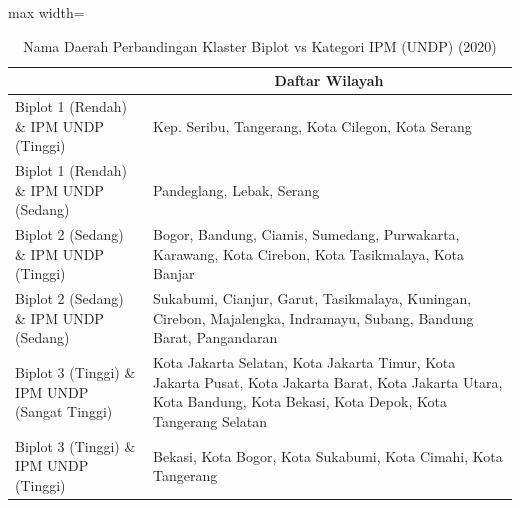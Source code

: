 \begin{table}[H]
\centering
\caption{Nama Daerah Perbandingan Klaster Biplot vs Kategori IPM (UNDP) (2020)} \label{tab:app2crossname2020}
\begin{adjustbox}{max width=\textwidth}
\begin{tabular}{|>{\centering\arraybackslash}p{4cm}|p{10cm}|}
\hline
\multicolumn{1}{|c|}{\textbf{Kategori}} & \multicolumn{1}{c|}{\textbf{Daftar Wilayah}} \\
\hline
Biplot 1 (Rendah) \& IPM UNDP (Tinggi) & Kep. Seribu, Tangerang, Kota Cilegon, Kota Serang \\
\hline
Biplot 1 (Rendah) \& IPM UNDP (Sedang) & Pandeglang, Lebak, Serang \\
\hline
Biplot 2 (Sedang) \& IPM UNDP (Tinggi) & Bogor, Bandung, Ciamis, Sumedang, Purwakarta, Karawang, Kota Cirebon, Kota Tasikmalaya, Kota Banjar \\
\hline
Biplot 2 (Sedang) \& IPM UNDP (Sedang) & Sukabumi, Cianjur, Garut, Tasikmalaya, Kuningan, Cirebon, Majalengka, Indramayu, Subang, Bandung Barat, Pangandaran \\
\hline
Biplot 3 (Tinggi) \& IPM UNDP (Sangat Tinggi) & Kota Jakarta Selatan, Kota Jakarta Timur, Kota Jakarta Pusat, Kota Jakarta Barat, Kota Jakarta Utara, Kota Bandung, Kota Bekasi, Kota Depok, Kota Tangerang Selatan \\
\hline
Biplot 3 (Tinggi) \& IPM UNDP (Tinggi) & Bekasi, Kota Bogor, Kota Sukabumi, Kota Cimahi, Kota Tangerang \\
\hline
\end{tabular}
\end{adjustbox}
\end{table}